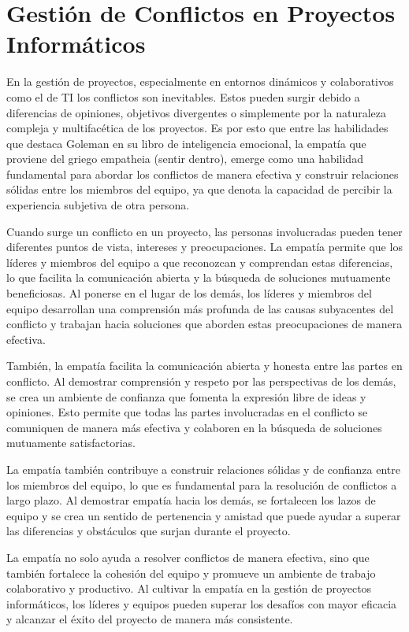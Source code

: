 \documentclass[journal]{IEEEtran}
\begin{document}
\section{Gestión de Conflictos en Proyectos Informáticos}
En la gestión de proyectos, especialmente en entornos dinámicos y colaborativos como el de TI los conflictos son inevitables. Estos pueden surgir debido a diferencias de opiniones, objetivos divergentes o simplemente por la naturaleza compleja y multifacética de los proyectos. Es por esto que entre las habilidades que destaca Goleman en su libro de inteligencia emocional, la empatía que proviene del griego empatheia (sentir dentro), emerge como una habilidad fundamental para abordar los conflictos de manera efectiva y construir relaciones sólidas entre los miembros del equipo, ya que denota la capacidad de percibir la experiencia subjetiva de otra persona.

Cuando surge un conflicto en un proyecto, las personas involucradas pueden tener diferentes puntos de vista, intereses y preocupaciones. La empatía permite que los líderes y miembros del equipo a que reconozcan y comprendan estas diferencias, lo que facilita la comunicación abierta y la búsqueda de soluciones mutuamente beneficiosas. Al ponerse en el lugar de los demás, los líderes y miembros del equipo desarrollan una comprensión más profunda de las causas subyacentes del conflicto y trabajan hacia soluciones que aborden estas preocupaciones de manera efectiva.

También, la empatía facilita la comunicación abierta y honesta entre las partes en conflicto. Al demostrar comprensión y respeto por las perspectivas de los demás, se crea un ambiente de confianza que fomenta la expresión libre de ideas y opiniones. Esto permite que todas las partes involucradas en el conflicto se comuniquen de manera más efectiva y colaboren en la búsqueda de soluciones mutuamente satisfactorias.

La empatía también contribuye a construir relaciones sólidas y de confianza entre los miembros del equipo, lo que es fundamental para la resolución de conflictos a largo plazo. Al demostrar empatía hacia los demás, se fortalecen los lazos de equipo y se crea un sentido de pertenencia y amistad que puede ayudar a superar las diferencias y obstáculos que surjan durante el proyecto.

La empatía no solo ayuda a resolver conflictos de manera efectiva, sino que también fortalece la cohesión del equipo y promueve un ambiente de trabajo colaborativo y productivo. Al cultivar la empatía en la gestión de proyectos informáticos, los líderes y equipos pueden superar los desafíos con mayor eficacia y alcanzar el éxito del proyecto de manera más consistente.
\end{document}
